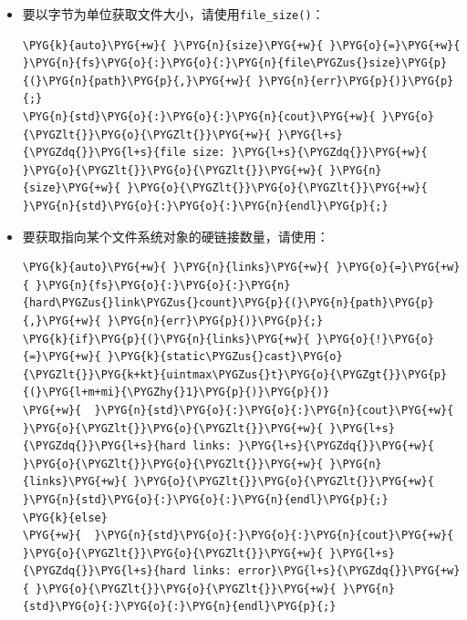 \begin{itemize}

\item 要以字节为单位获取文件大小，请使用\texttt{file\_\allowbreak{}size()}：



\begin{codeblockbg}
\begin{Verbatim}[commandchars=\\\{\},breaklines=true,breakanywhere=true,fontsize=\codefont,xleftmargin=17bp]
\PYG{k}{auto}\PYG{+w}{ }\PYG{n}{size}\PYG{+w}{ }\PYG{o}{=}\PYG{+w}{ }\PYG{n}{fs}\PYG{o}{:}\PYG{o}{:}\PYG{n}{file\PYGZus{}size}\PYG{p}{(}\PYG{n}{path}\PYG{p}{,}\PYG{+w}{ }\PYG{n}{err}\PYG{p}{)}\PYG{p}{;}
\PYG{n}{std}\PYG{o}{:}\PYG{o}{:}\PYG{n}{cout}\PYG{+w}{ }\PYG{o}{\PYGZlt{}}\PYG{o}{\PYGZlt{}}\PYG{+w}{ }\PYG{l+s}{\PYGZdq{}}\PYG{l+s}{file size: }\PYG{l+s}{\PYGZdq{}}\PYG{+w}{ }\PYG{o}{\PYGZlt{}}\PYG{o}{\PYGZlt{}}\PYG{+w}{ }\PYG{n}{size}\PYG{+w}{ }\PYG{o}{\PYGZlt{}}\PYG{o}{\PYGZlt{}}\PYG{+w}{ }\PYG{n}{std}\PYG{o}{:}\PYG{o}{:}\PYG{n}{endl}\PYG{p}{;}
\end{Verbatim}
\end{codeblockbg}



\item 要获取指向某个文件系统对象的硬链接数量，请使用：



\begin{codeblockbg}
\begin{Verbatim}[commandchars=\\\{\},breaklines=true,breakanywhere=true,fontsize=\codefont,xleftmargin=17bp]
\PYG{k}{auto}\PYG{+w}{ }\PYG{n}{links}\PYG{+w}{ }\PYG{o}{=}\PYG{+w}{ }\PYG{n}{fs}\PYG{o}{:}\PYG{o}{:}\PYG{n}{hard\PYGZus{}link\PYGZus{}count}\PYG{p}{(}\PYG{n}{path}\PYG{p}{,}\PYG{+w}{ }\PYG{n}{err}\PYG{p}{)}\PYG{p}{;}
\PYG{k}{if}\PYG{p}{(}\PYG{n}{links}\PYG{+w}{ }\PYG{o}{!}\PYG{o}{=}\PYG{+w}{ }\PYG{k}{static\PYGZus{}cast}\PYG{o}{\PYGZlt{}}\PYG{k+kt}{uintmax\PYGZus{}t}\PYG{o}{\PYGZgt{}}\PYG{p}{(}\PYG{l+m+mi}{\PYGZhy{}1}\PYG{p}{)}\PYG{p}{)}
\PYG{+w}{  }\PYG{n}{std}\PYG{o}{:}\PYG{o}{:}\PYG{n}{cout}\PYG{+w}{ }\PYG{o}{\PYGZlt{}}\PYG{o}{\PYGZlt{}}\PYG{+w}{ }\PYG{l+s}{\PYGZdq{}}\PYG{l+s}{hard links: }\PYG{l+s}{\PYGZdq{}}\PYG{+w}{ }\PYG{o}{\PYGZlt{}}\PYG{o}{\PYGZlt{}}\PYG{+w}{ }\PYG{n}{links}\PYG{+w}{ }\PYG{o}{\PYGZlt{}}\PYG{o}{\PYGZlt{}}\PYG{+w}{ }\PYG{n}{std}\PYG{o}{:}\PYG{o}{:}\PYG{n}{endl}\PYG{p}{;}
\PYG{k}{else}
\PYG{+w}{  }\PYG{n}{std}\PYG{o}{:}\PYG{o}{:}\PYG{n}{cout}\PYG{+w}{ }\PYG{o}{\PYGZlt{}}\PYG{o}{\PYGZlt{}}\PYG{+w}{ }\PYG{l+s}{\PYGZdq{}}\PYG{l+s}{hard links: error}\PYG{l+s}{\PYGZdq{}}\PYG{+w}{ }\PYG{o}{\PYGZlt{}}\PYG{o}{\PYGZlt{}}\PYG{+w}{ }\PYG{n}{std}\PYG{o}{:}\PYG{o}{:}\PYG{n}{endl}\PYG{p}{;}
\end{Verbatim}
\end{codeblockbg}



\end{itemize}
